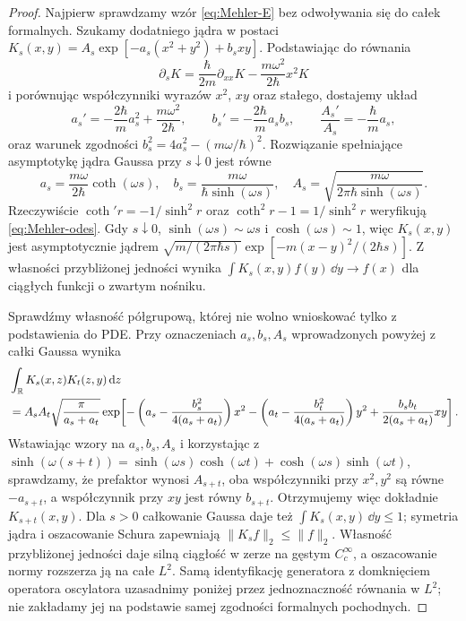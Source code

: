 \begin{proof}
Najpierw sprawdzamy wzór \eqref{eq:Mehler-E}
bez odwoływania się do całek formalnych.
Szukamy dodatniego jądra w postaci
$K_s(x,y)=A_s\exp[-a_s(x^2+y^2)+b_sxy]$.
Podstawiając do równania
\[
 \partial_sK=\frac{\hbar}{2m}\partial_{xx}K
    -\frac{m\omega^2}{2\hbar}x^2K
\]
i porównując współczynniki wyrazów $x^2$, $xy$
oraz stałego, dostajemy układ
\[
 a_s'= -\frac{2\hbar}{m}a_s^2+
       \frac{m\omega^2}{2\hbar},\qquad
 b_s'=-\frac{2\hbar}{m}a_sb_s,\qquad
 \frac{A_s'}{A_s}=-\frac{\hbar}{m}a_s,
\tag{16.11}\label{eq:Mehler-odes}
\]
oraz warunek zgodności
$b_s^2=4a_s^2-(m\omega/\hbar)^2$.
Rozwiązanie spełniające asymptotykę jądra Gaussa
przy $s\downarrow0$ jest równe
\[
 a_s=\frac{m\omega}{2\hbar}\coth(\omega s),\quad
 b_s=\frac{m\omega}{\hbar\sinh(\omega s)},\quad
 A_s=\sqrt{\frac{m\omega}{2\pi\hbar\sinh(\omega s)}}.
\]
Rzeczywiście $\coth' r=-1/\sinh^2r$ oraz
$\coth^2r-1=1/\sinh^2r$ weryfikują
\eqref{eq:Mehler-odes}. Gdy $s\downarrow0$,
$\sinh(\omega s)\sim\omega s$ i
$\cosh(\omega s)\sim1$, więc $K_s(x,y)$ jest
asymptotycznie jądrem
$\sqrt{m/(2\pi\hbar s)}
\exp[-m(x-y)^2/(2\hbar s)]$.
Z własności przybliżonej jedności wynika
$\int K_s(x,y)f(y)\,\dd y\to f(x)$
dla ciągłych funkcji o zwartym nośniku.

Sprawdźmy własność półgrupową, której nie wolno
wnioskować tylko z podstawienia do PDE. Przy oznaczeniach
$a_s,b_s,A_s$ wprowadzonych powyżej z całki Gaussa wynika
\[
\begin{split}
&\int_{\mathbb{R}}K_s(x,z)K_t(z,y)\,\mathrm{d} z\\
&=A_sA_t\sqrt{\frac{\pi}{a_s+a_t}}
\exp\!\left[-\left(a_s-\frac{b_s^2}{4(a_s+a_t)}\right)x^2
-\left(a_t-\frac{b_t^2}{4(a_s+a_t)}\right)y^2
+\frac{b_sb_t}{2(a_s+a_t)}xy\right].
\end{split}
\]
Wstawiając wzory na $a_s,b_s,A_s$ i korzystając z
$\sinh(\omega(s+t))=\sinh(\omega s)\cosh(\omega t)
+\cosh(\omega s)\sinh(\omega t)$, sprawdzamy, że
prefaktor wynosi $A_{s+t}$, oba współczynniki przy
$x^2,y^2$ są równe $-a_{s+t}$, a współczynnik przy
$xy$ jest równy $b_{s+t}$. Otrzymujemy więc dokładnie
$K_{s+t}(x,y)$.
Dla $s>0$ całkowanie Gaussa daje też
$\int K_s(x,y)\,\dd y\le1$; symetria jądra i
oszacowanie Schura zapewniają
$\|K_sf\|_2\le\|f\|_2$.
Własność przybliżonej jedności daje silną ciągłość
w zerze na gęstym $C_c^\infty$, a oszacowanie normy
rozszerza ją na całe $L^2$. Samą identyfikację
generatora z domknięciem operatora oscylatora
uzasadnimy poniżej przez jednoznaczność równania
w $L^2$; nie zakładamy jej na podstawie samej
zgodności formalnych pochodnych.


\end{proof}
